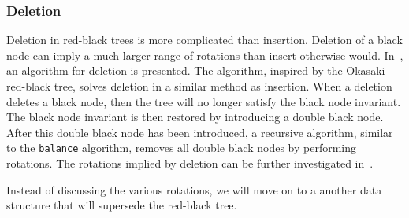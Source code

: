 \subsubsection{Deletion}
Deletion in red-black trees is more complicated than insertion.
Deletion of a black node can imply a much larger range of rotations than insert otherwise would.
In~\cite{germane2014deletion}, an algorithm for deletion is presented.
The algorithm, inspired by the Okasaki red-black tree, solves deletion in a similar method as insertion.
When a deletion deletes a black node, then the tree will no longer satisfy the black node invariant.
The black node invariant is then restored by introducing a double black node.
After this double black node has been introduced, a recursive algorithm, similar to the \texttt{balance} algorithm, removes all double black nodes by performing rotations.
The rotations implied by deletion can be further investigated in~\cite{germane2014deletion}.

Instead of discussing the various rotations, we will move on to a another data structure that will supersede the red-black tree.

